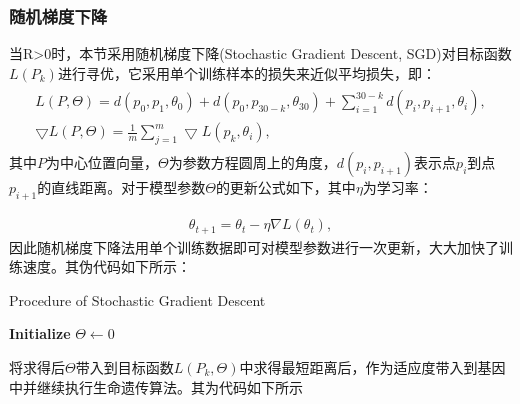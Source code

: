 \documentclass{whutmod}
\begin{document}
	\subsubsection{随机梯度下降}	
    	 当R>0时，本节采用随机梯度下降(Stochastic Gradient Descent, SGD)对目标函数$L(P_k)$进行寻优，它采用单个训练样本的损失来近似平均损失，即：
    	 	    \begin{gather}
    	 \begin{matrix}
    	 L(P,\Theta)=d(p_0,p_{1},\theta_0)+d(p_0,p_{30-k},\theta_{30})+\sum_{i=1}^{30-k}d(p_i,p_{i+1},\theta_{i}) ,\\ 
    	 \bigtriangledown  L(P,\Theta)= \frac{1}{m}\sum_{j=1}^{m}\bigtriangledown L(p_k,\theta_{i}),
    	 \end{matrix}
    	 \end{gather}
    	 其中$P$为中心位置向量，$\Theta$为参数方程圆周上的角度，$d(p_i,p_{i+1})$表示点$p_i$到点$p_{i+1}$的直线距离。对于模型参数$\Theta$的更新公式如下，其中$\eta$为学习率：
    	 
    	 \begin{gather}
			\theta_{t+1}=\theta_{t}-\eta \nabla L\left(\theta_{t}\right),
    	 \end{gather}
    	 因此随机梯度下降法用单个训练数据即可对模型参数进行一次更新，大大加快了训练速度。其伪代码如下所示：
    	 
    	   	\begin{algorithm}[H]
    	 	\caption{Procedure of Stochastic Gradient Descent}
    	 	\LinesNumbered
    	 	\textbf{Initialize} $\Theta \leftarrow 0$ \newline
    	 	\Return {$\Theta$ }
    	 \end{algorithm}
		
		将求得后$\Theta$带入到目标函数$L(P_k, \Theta)$中求得最短距离后，作为适应度带入到基因中并继续执行生命遗传算法。其为代码如下所示
		
\end{document}
